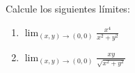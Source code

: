Calcule los siguientes límites:
\begin{enumerate}
    \item $\displaystyle\lim_{(x,y)\to(0,0)} \frac{x^4}{x^2 + y^2}$
    \item $\displaystyle\lim_{(x,y)\to(0,0)} \frac{xy}{\sqrt{x^2 + y^2}}$
\end{enumerate}
